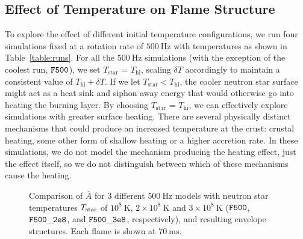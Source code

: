 \documentclass[preprint,times,tighten]{aastex63}
\begin{document}

\subsection{Effect of Temperature on Flame Structure}\label{ssec:temp_structure}

To explore the effect of different initial temperature configurations, we run four simulations fixed at a rotation rate of $500~\mathrm{Hz}$ with temperatures as shown in Table~\ref{table:runs}. For all the $500~\mathrm{Hz}$ simulations (with the exception of the coolest run, $\tt{F500}$), we set $T_\mathrm{star}$ = $T_\mathrm{hi}$, scaling $\delta T$ accordingly to maintain a consistent value of $T_\mathrm{hi} + \delta T$. If we let $T_\mathrm{star} < T_\mathrm{hi}$, the cooler neutron star surface might act as a heat sink and siphon away energy that would otherwise go into heating the burning layer. By choosing $T_\mathrm{star}$ = $T_\mathrm{hi}$, we can effectively explore simulations with greater surface heating. There are several physically distinct mechanisms that could produce an increased temperature at the crust: crustal heating, some other form of shallow heating or a higher accretion rate. In these simulations, we do not model the mechanism producing the heating effect, just the effect itself, so we do not distinguish between which of these mechanisms cause the heating.

\begin{figure}[t]
\centering
{}
\caption{\label{fig:compare_500Hz_abar} Comparison of $\bar{A}$ for 3 different $500~\mathrm{Hz}$ models with neutron star temperatures $T_{\rm star}$ of $10^8~\mathrm{K}$, $2\times10^8~\mathrm{K}$ and $3\times10^8~\mathrm{K}$ ($\tt{F500}$, $\tt{F500\_2e8}$, and $\tt{F500\_3e8}$, respectively), and resulting envelope structures.  Each flame is shown at $70~\mathrm{ms}$.} 
\end{figure}
\end{document}
